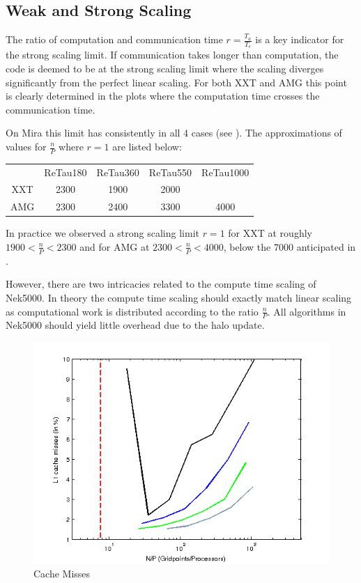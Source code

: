 \documentclass{sig-alternate}
\begin{document}
\subsection{Weak and Strong Scaling}

The ratio of computation and communication time $r=\frac{T_a}{T_c}$ is a key
indicator for the strong scaling limit. If communication takes longer than
computation, the code is deemed to be at the strong scaling limit where the
scaling diverges significantly from the perfect linear scaling. For both XXT and
AMG this point is clearly determined in the plots where the computation time
crosses the communication time. 

On Mira this limit has consistently in all 4 cases (see
). The approximations of values for $\frac{n}{P}$ where
$r=1$ are listed below:
  
\begin{tabular}{ccccc}
  &ReTau180&ReTau360&ReTau550&ReTau1000\\
  XXT&2300&1900&2000&\\
  AMG&2300&2400&3300&4000\\
\end{tabular}

In practice we observed a strong scaling limit $r=1$ for XXT at roughly $1900<
\frac{n}{P} < 2300$ and for AMG at $2300<\frac{n}{P}<4000$, below the $7000$
anticipated in \cite{fischer:scaling}. 

However, there are two intricacies related to the compute time scaling of
Nek5000. In theory the compute time scaling should exactly match linear scaling
as computational work is distributed according to the ratio $\frac{n}{P}$. All
algorithms in Nek5000 should yield little overhead due to the halo update. 

\begin{figure}
  \centering
  \includegraphics[width=\linewidth]{./figures/cachelines.png}
  \caption{Cache Misses}
  \label{fig:cachemisses}
\end{figure}
\end{document}
